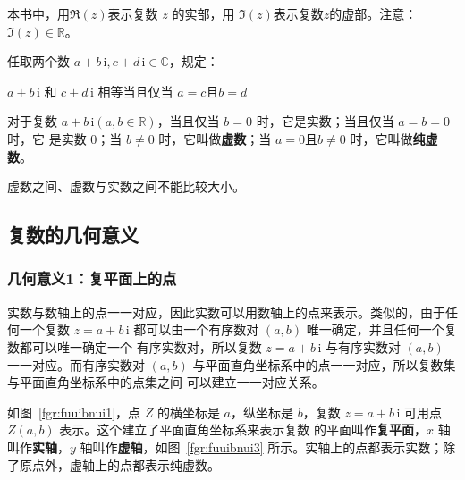 \documentclass[a4paper,openany]{ctexbook}
\newcommand{\ii}{\,\mathrm{i}}
\begin{document}
本书中，用\(\Re(z)\)表示复数 \(z\) 的实部，用 \(\Im(z)\)表示复数\(z\)的虚部。注意：\(\Im(z)\in \mathbb{R} \)。

任取两个数 \(a+b \ii,c+d \ii\in \mathbb{C}\)，规定：

\centerline{\(a+b \ii\) 和 \(c+d \ii\) 相等当且仅当 \(a=c\text{且} b=d\)}

对于复数 \(a+b \ii(a,b\in \mathbb{R})\)，当且仅当 \(b=0\) 时，它是实数；当且仅当 \(a=b=0\) 时，它
是实数 \(0\)；当 \(b \ne 0\) 时，它叫做\textbf{虚数}；当 \(a=0 \text{且} b \ne 0\) 时，它叫做\textbf{纯虚数}。

虚数之间、虚数与实数之间不能比较大小。

\subsection{复数的几何意义}

\subsubsection{几何意义1：复平面上的点}

实数与数轴上的点一一对应，因此实数可以用数轴上的点来表示。类似的，由于任何一个复数 \(z=a+b \ii\) 都可以由一个有序数对 \((a,b)\) 唯一确定，并且任何一个复数都可以唯一确定一个
有序实数对，所以复数 \(z=a+b \ii\) 与有序实数对 \((a,b)\) 一一对应。而有序实数对 \((a,b)\) 与平面直角坐标系中的点一一对应，所以复数集与平面直角坐标系中的点集之间
可以建立一一对应关系。

如图~\ref{fgr:fuuibnui1}，点 \(Z\) 的横坐标是 \(a\)，纵坐标是 \(b\)，复数 \(z=a+b \ii\) 可用点 \(Z(a,b)\) 表示。这个建立了平面直角坐标系来表示复数
的平面叫作\textbf{复平面}，\(x\) 轴叫作\textbf{实轴}，\(y\) 轴叫作\textbf{虚轴}，如图~\ref{fgr:fuuibnui3} 所示。实轴上的点都表示实数；除了原点外，虚轴上的点都表示纯虚数。
\end{document}
